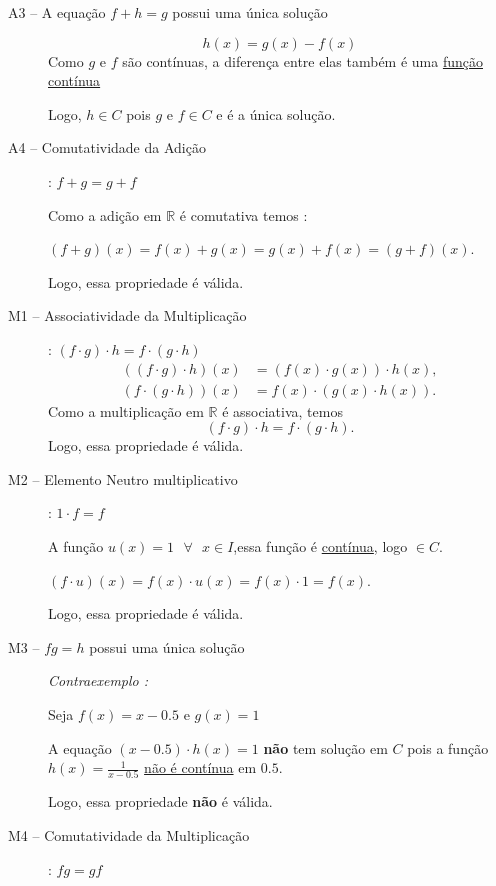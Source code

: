 \begin{enumerate}[label=1.\arabic*.]
\begin{description}
    \item[A3 -- A equação $f + h = g$ possui uma única solução]  
    
    \[
    h(x) = g(x) - f(x)
    \]
    Como $g$ e $f$ são contínuas, a diferença entre elas também é uma \underline{função contínua}
    
    Logo, $h \in C$ pois $g$ e $f \in C$ e é a única solução.

    \item[A4 -- Comutatividade da Adição] : $f + g = g + f$  

    Como a adição em $\mathbb{R}$ é comutativa temos :

    $(f+g)(x) = f(x)+g(x) = g(x)+f(x) = (g+f)(x)$.
    
    Logo, essa propriedade é válida. 

    \item[M1 -- Associatividade da Multiplicação] : $(f \cdot g) \cdot h = f \cdot (g \cdot h)$  
    \begin{align*}
    ((f \cdot g) \cdot h)(x) &= (f(x) \cdot g(x)) \cdot h(x), \\
    (f \cdot (g \cdot h))(x) &= f(x) \cdot (g(x) \cdot h(x)).
    \end{align*}
    Como a multiplicação em $\mathbb{R}$ é associativa, temos
    \[
    (f \cdot g) \cdot h = f \cdot (g \cdot h).
    \]
    Logo, essa propriedade é válida.

    \item[M2 -- Elemento Neutro multiplicativo] : $1 \cdot f = f$
    
    A função $u(x) = 1 \text{ } \forall \text{ } x \in I$,essa função é \underline{contínua}, logo $\in C$. 
    
    $(f \cdot u)(x) = f(x) \cdot u(x) = f(x)\cdot 1 = f(x)$.

    Logo, essa propriedade é válida.
    
    \item[M3 -- $fg =h$ possui uma única solução]
    
    \textit{Contraexemplo : }

    Seja $f(x) = x - 0.5 \text{ e } g(x) = 1$

    A equação $(x - 0.5) \cdot h(x) = 1$ \textbf{não} tem solução em $C$ pois a função $h(x) = \frac{1}{x - 0.5}$ 
    \underline{não é contínua} em $0.5$.

    Logo, essa propriedade \textbf{não} é válida.

    \item[M4 -- Comutatividade da Multiplicação] : $fg = gf$
    

\end{description}
\end{enumerate}
